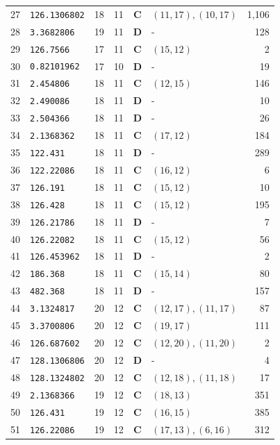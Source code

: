 \documentclass[11pt,a4paper]{article}
\begin{document}
\begin{small}
\begin{longtable}{r l c c c l r}
27 & \texttt{126.1306802} & 18 & 11 & \textbf{C} & $(11,17), (10,17)$ & 1,106 \\
28 & \texttt{3.3682806} & 19 & 11 & \textbf{D} & - & 128 \\
29 & \texttt{126.7566} & 17 & 11 & \textbf{C} & $(15,12)$ & 2 \\
30 & \texttt{0.82101962} & 17 & 10 & \textbf{D} & - & 19 \\
31 & \texttt{2.454806} & 18 & 11 & \textbf{C} & $(12,15)$ & 146 \\
32 & \texttt{2.490086} & 18 & 11 & \textbf{D} & - & 10 \\
33 & \texttt{2.504366} & 18 & 11 & \textbf{D} & - & 26 \\
34 & \texttt{2.1368362} & 18 & 11 & \textbf{C} & $(17,12)$ & 184 \\
35 & \texttt{122.431} & 18 & 11 & \textbf{D} & - & 289 \\
36 & \texttt{122.22086} & 18 & 11 & \textbf{C} & $(16,12)$ & 6 \\
37 & \texttt{126.191} & 18 & 11 & \textbf{C} & $(15,12)$ & 10 \\
38 & \texttt{126.428} & 18 & 11 & \textbf{C} & $(15,12)$ & 195 \\
39 & \texttt{126.21786} & 18 & 11 & \textbf{D} & - & 7 \\
40 & \texttt{126.22082} & 18 & 11 & \textbf{C} & $(15,12)$ & 56 \\
41 & \texttt{126.453962} & 18 & 11 & \textbf{D} & - & 2 \\
42 & \texttt{186.368} & 18 & 11 & \textbf{C} & $(15,14)$ & 80 \\
43 & \texttt{482.368} & 18 & 11 & \textbf{D} & - & 157 \\
44 & \texttt{3.1324817} & 20 & 12 & \textbf{C} & $(12,17), (11,17)$ & 87 \\
45 & \texttt{3.3700806} & 20 & 12 & \textbf{C} & $(19,17)$ & 111 \\
46 & \texttt{126.687602} & 20 & 12 & \textbf{C} & $(12,20), (11,20)$ & 2 \\
47 & \texttt{128.1306806} & 20 & 12 & \textbf{D} & - & 4 \\
48 & \texttt{128.1324802} & 20 & 12 & \textbf{C} & $(12,18), (11,18)$ & 17 \\
49 & \texttt{2.1368366} & 19 & 12 & \textbf{C} & $(18,13)$ & 351 \\
50 & \texttt{126.431} & 19 & 12 & \textbf{C} & $(16,15)$ & 385 \\
51 & \texttt{126.22086} & 19 & 12 & \textbf{C} & $(17,13), (6,16)$ & 312 \\

\end{longtable}
\end{small}
\end{document}
